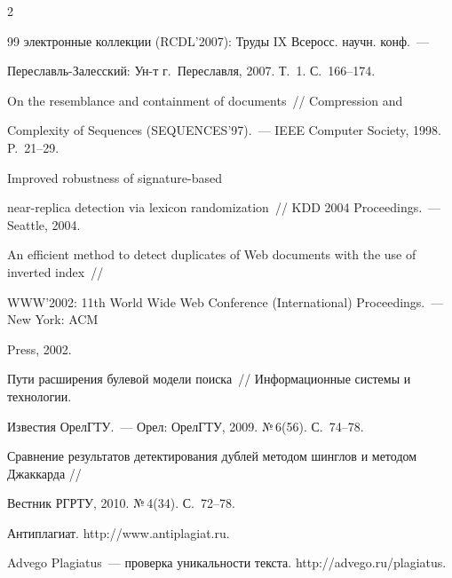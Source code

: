 \begin{multicols}{2}
{{\begin{thebibliography}{99}
электронные коллекции (RCDL'2007): Труды IX Всеросс. научн. конф.~--- 

  Пе\-ре\-славль-За\-лес\-ский: Ун-т г.~Переславля, 2007. Т.~1. С.~166--174.

  


   On the resemblance and containment of documents~// Compression and 

Complexity of Sequences (SEQUENCES'97).~--- IEEE Computer Society, 1998. P.~21--29.

  


   Improved robustness of signature-based 

  near-replica detection via lexicon randomization~//  KDD 2004 Proceedings.~--- Seattle, 2004.

  



  An efficient method to detect duplicates of Web documents with the use of inverted index~// 

WWW'2002: 11th World Wide Web Conference (International) Proceedings.~---  New York: ACM 

Press, 2002. 

  



  Пути расширения булевой модели поиска~// Информационные сис\-те\-мы и технологии. 

Известия ОрелГТУ.~--- Орел: ОрелГТУ, 2009. №\,6(56). С.~74--78.

  



  Сравнение результатов детектирования дублей методом шинглов и методом Джаккарда // 

Вестник РГРТУ, 2010. №\,4(34). С.~72--78.

  


  Антиплагиат. {\sf http://www.antiplagiat.ru}.

  


  Advego Plagiatus~--- проверка уникальности текста. {\sf http://advego.ru/plagiatus}.


\end{thebibliography}}}
\end{multicols}
